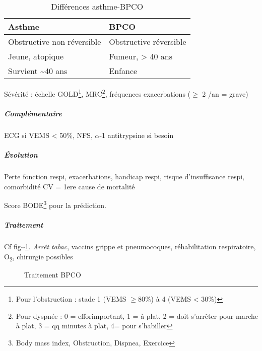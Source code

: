 \documentclass[11pt]{article}
\begin{document}
\begin{table}[htbp]
\caption{\label{tab:org62246bc}Différences asthme-BPCO}
\centering
\begin{tabular}{ll}
Asthme & BPCO\\
\hline
Obstructive non réversible & Obstructive réversible\\
Jeune, atopique & Fumeur, > 40 ans\\
Survient \textasciitilde{}40 ans & Enfance\\
\end{tabular}
\end{table}

Sévérité : échelle GOLD\footnote{Pour l'obstruction : stade 1 (VEMS \(\ge 80\%\)) à 4 (VEMS < 30\%)}, MRC\footnote{Pour dyspnée : 0 = efforimportant, 1 = à plat, 2 = doit s'arrêter pour
marche à plat, 3 = qq minutes à plat, 4= pour s'habiller}, fréquences exacerbations (\(\ge\) 2 /an = grave)

\subparagraph{Complémentaire}
\label{sec:org825b382}
ECG si VEMS < 50\%, NFS, \(\alpha\)-1 antitrypsine si besoin
\subparagraph{Évolution}
\label{sec:org43f1352}
Perte fonction respi, exacerbations, handicap respi, risque
d'insuffisance respi, comorbidité CV = 1ere cause de mortalité

Score BODE\footnote{Body mass index, Obstruction, Dispnea, Exercice} pour la prédiction.
\subparagraph{Traitement}
\label{sec:org1dea37c}
Cf fig\textasciitilde{}\ref{fig:ttt_bpco}. 
\emph{Arrêt tabac}, vaccins grippe et pneumocoques, réhabilitation respiratoire, O\textsubscript{2}, chirurgie possibles
\begin{figure}[htpb]
  \centering
  \caption{Traitement BPCO}
  \label{fig:ttt_bpco}
\end{figure}
\end{document}
